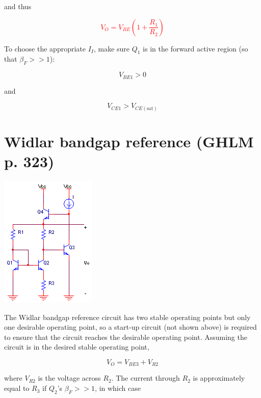 \noindent and thus

\textcolor{red}{
\begin{equation}
V_{O} = V_{BE}\left(1+\frac{R_{1}}{R_{2}}\right)
\label{eq:vbe_multiplier_Vo}
\end{equation}
}

To choose the appropriate $I_{I}$, make sure $Q_{1}$ is in the forward active region (so that $\beta_{F} >> 1$):

\begin{equation}
V_{BE1} > 0
\end{equation}

\noindent and

\begin{equation}
V_{CE1} > V_{CE(\text{sat})}
\end{equation}

\section{Widlar bandgap reference (GHLM p. 323)}
\begin{center}
	\includegraphics{schematics/Widlar_bandgap.PNG}
\end{center}
The Widlar bandgap reference circuit has two stable operating points but only one desirable operating point, so a start-up circuit (not shown above) is required to ensure that the circuit reaches the desirable operating point. Assuming the circuit is in the desired stable operating point,

\begin{equation}
V_{O} = V_{BE3} + V_{R2}
\label{eq:Widlar_bandgap_Vo_basic}
\end{equation}

\noindent where $V_{R2}$ is the voltage across $R_{2}$. The current through $R_{2}$ is approximately equal to $R_{3}$ if $Q_{2}$'s $\beta_{F} >> 1$, in which case

